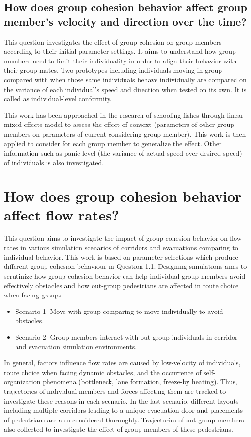 \documentclass[a4paper,11pt,phdthesis,singlespace,twoside]{cssethesis}
\begin{document}
\subsection{How does group cohesion behavior affect group member’s velocity and direction over the time?}
This question investigates the effect of group cohesion on group members according to their initial parameter settings. It aims to understand how group members need to limit their individuality in order to align their behavior with their group mates. Two prototypes including individuals moving in group compared with when those same individuals behave individually are compared on the variance of each individual’s speed and direction when tested on its own. It is called as individual-level conformity.

This work has been approached in the research of schooling fishes \cite{Herbert2012} through linear mixed-effects model to assess the effect of context (parameters of other group members on parameters of current considering group member). This work is then applied to consider for each group member to generalize the effect. Other information such as panic level (the variance of actual speed over desired speed) of individuals is also investigated.

\section{How does group cohesion behavior affect flow rates?}
This question aims to investigate the impact of group cohesion behavior on flow rates in various simulation scenarios of corridors and evacuations comparing to individual behavior. This work is based on parameter selections which produce different group cohesion behaviour in Question 1.1. Designing simulations aims to scrutinize how group cohesion behavior can help individual group members avoid effectively obstacles and how out-group pedestrians are affected in route choice when facing groups. 
\begin{itemize}
	\item Scenario 1: Move with group comparing to move individually to avoid obstacles.
	\item Scenario 2: Group members interact with out-group individuals in corridor and evacuation simulation environments.
\end{itemize}
In general, factors influence flow rates are caused by low-velocity of individuals, route choice when facing dynamic obstacles, and the occurrence of self-organization phenomena (bottleneck, lane formation, freeze-by heating). Thus, trajectories of individual members and forces affecting them are tracked to investigate these reasons in each scenario. In the last scenario, different layouts including multiple corridors leading to a unique evacuation door and placements of pedestrians are also considered thoroughly. Trajectories of out-group members also collected to investigate the effect of group members of these pedestrians. 
\end{document}
